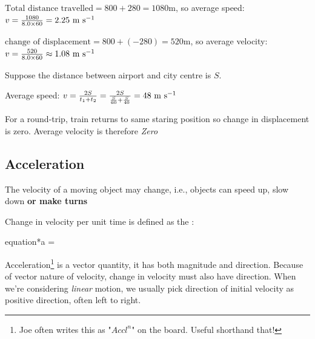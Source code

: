 
\begin{soln} $\text{Total distance travelled} = 800 + 280 = 1080 \text{m}$, so average speed: $v = \frac{1080}{8.0\times60} = 2.25 \text{ m s$^{-1}$}$

\eqyskip  $\text{change of displacement} = 800 + (-280) = 520 \text{m}$, so average velocity: $v = \frac{520}{8.0\times60} \approx 1.08 \text{ m s$^{-1}$}$ \end{soln}


\begin{soln} Suppose the distance between airport and city centre is $S$.

Average speed: $v = \frac{2S}{t_1 + t_2} = \frac{2S}{\frac{S}{60} + \frac{S}{40}} = 48 \text{ m s$^{-1}$}$

For a round-trip, train returns to same staring position so change in displacement is zero. Average velocity is therefore \emph{Zero} \end{soln} 


\subsection{Acceleration}

The velocity of a moving object may change, i.e., objects can speed up, slow down \textbf{or make turns}

\begin{ilight}
	\centering Change in velocity per unit time is defined as the : \begin{empheq}[box=\tcbhighmath]{equation*}{a = }\end{empheq}
\end{ilight}


Acceleration\footnote{Joe often writes this as "$Accl^{n}$" on the board. Useful shorthand that!} is a vector quantity, it has both magnitude and direction. Because of vector nature of velocity, change in velocity must also have direction. When we're considering \emph{linear} motion, we usually pick direction of initial velocity as positive direction, often left to right.


